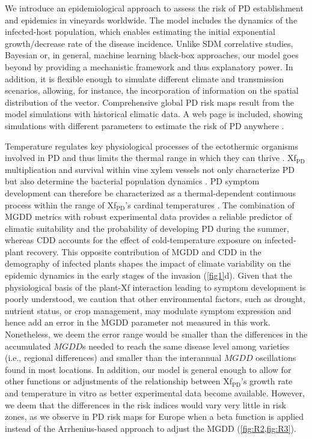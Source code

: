     We introduce an epidemiological approach to assess the risk of PD
    establishment and epidemics in vineyards worldwide. The model includes the
    dynamics of the infected-host population, which enables estimating the
    initial exponential growth/decrease rate of the disease incidence. Unlike
    SDM correlative studies, Bayesian or, in general, machine learning
    black-box approaches, our model goes beyond by providing a mechanistic
    framework and thus explanatory power. In addition, it is flexible enough to
    simulate different climate and transmission scenarios, allowing, for
    instance, the incorporation of information on the spatial distribution of
    the vector. Comprehensive global PD risk maps result from the model
    simulations with historical climatic data. A web page is included, showing
    simulations with different parameters to estimate the risk of PD anywhere
    \cite{Webpage}.

    Temperature regulates key physiological processes of the ectothermic
    organisms involved in PD and thus limits the thermal range in which they
    can thrive \cite{Coakley1999}. Xf$_{\textrm{PD}}$ multiplication and
    survival within vine xylem vessels not only characterize PD but also
    determine the bacterial population dynamics
    \cite{fry1990multiplication,Feil2001}. PD symptom development can therefore
    be characterized as a thermal-dependent continuous process within
    the range of  Xf$_{\textrm{PD}}$'s cardinal temperatures \cite{Scherm1994}.
    The combination of MGDD metrics with robust experimental data provides a
    reliable predictor of climatic suitability and the probability of
    developing PD during the summer, whereas CDD accounts for the effect of
    cold-temperature exposure on infected-plant recovery. This opposite
    contribution of MGDD and CDD in the demography of infected plants shapes
    the impact of climate variability on the epidemic dynamics in the early
    stages of the invasion (\cref{fig1}d). Given that the physiological basis
    of the plant-Xf interaction leading to symptom development is poorly
    understood, we caution that other environmental factors, such as drought,
    nutrient status, or crop management, may modulate symptom expression and
    hence add an error in the MGDD parameter not measured in this work.
    Nonetheless, we deem the error range would be smaller than the differences
    in the accumulated $MGDD$s needed to reach the same disease level among
    varieties (i.e., regional differences) and smaller than the interannual
$MGDD$ oscillations found in most locations. In addition, our model is general
    enough to allow for other functions or adjustments of the relationship
    between Xf$_{\textrm{PD}}$'s growth rate and temperature in vitro
    as better experimental data become available. However, we deem that the
    differences in the risk indices would vary very little in risk zones, as we
    observe in PD risk maps for Europe when a beta function is applied instead
    of the Arrhenius-based approach to adjust the MGDD (\cref{fig:R2,fig:R3}).

